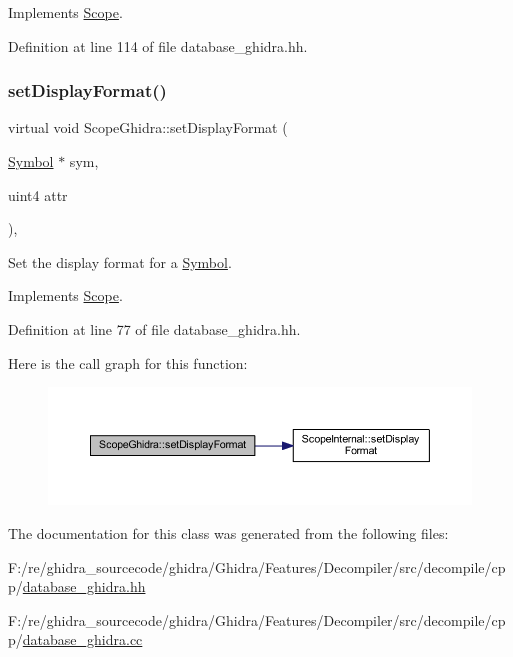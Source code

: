 Implements \mbox{\hyperlink{class_scope_ac807e11df36854d2f7983bdd6779e83a}{Scope}}.



Definition at line 114 of file database\+\_\+ghidra.\+hh.

\mbox{\label{class_scope_ghidra_ae74dd0dfc3b70347a2ed19688adfd155}} 
\subsubsection{\texorpdfstring{setDisplayFormat()}{setDisplayFormat()}}
{\footnotesize\ttfamily virtual void Scope\+Ghidra\+::set\+Display\+Format (\begin{DoxyParamCaption}\item[{\mbox{\hyperlink{class_symbol}{Symbol}} $\ast$}]{sym,  }\item[{uint4}]{attr }\end{DoxyParamCaption})\hspace{0.3cm}{\ttfamily [inline]}, {\ttfamily [virtual]}}



Set the display format for a \mbox{\hyperlink{class_symbol}{Symbol}}. 



Implements \mbox{\hyperlink{class_scope_ae799cc3171536b9ee10497631aea8c5b}{Scope}}.



Definition at line 77 of file database\+\_\+ghidra.\+hh.

Here is the call graph for this function\+:
\nopagebreak
\begin{figure}[H]
\begin{center}
\leavevmode
\includegraphics[width=350pt]{class_scope_ghidra_ae74dd0dfc3b70347a2ed19688adfd155_cgraph}
\end{center}
\end{figure}


The documentation for this class was generated from the following files\+:\begin{DoxyCompactItemize}
\item 
F\+:/re/ghidra\+\_\+sourcecode/ghidra/\+Ghidra/\+Features/\+Decompiler/src/decompile/cpp/\mbox{\hyperlink{database__ghidra_8hh}{database\+\_\+ghidra.\+hh}}\item 
F\+:/re/ghidra\+\_\+sourcecode/ghidra/\+Ghidra/\+Features/\+Decompiler/src/decompile/cpp/\mbox{\hyperlink{database__ghidra_8cc}{database\+\_\+ghidra.\+cc}}\end{DoxyCompactItemize}
